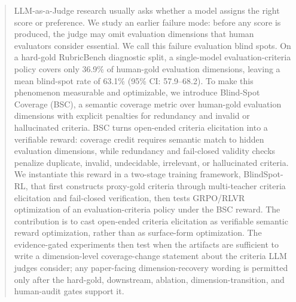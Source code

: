 \begin{abstract}
LLM-as-a-Judge research usually asks whether a model assigns the right score or
preference. We study an earlier failure mode: before any score is produced, the
judge may omit evaluation dimensions that human evaluators consider essential.
We call this failure evaluation blind spots. On a hard-gold RubricBench
diagnostic split, a single-model evaluation-criteria policy covers only 36.9\% of
human-gold evaluation dimensions, leaving a mean blind-spot rate of 63.1\%
(95\% CI: 57.9--68.2). To make this phenomenon measurable and optimizable, we
introduce Blind-Spot Coverage (BSC), a semantic coverage metric over
human-gold evaluation dimensions with explicit penalties for redundancy and
invalid or hallucinated criteria. BSC turns open-ended criteria elicitation into a
verifiable reward: coverage credit requires semantic match to hidden evaluation
dimensions, while redundancy and fail-closed validity checks penalize duplicate,
invalid, undecidable, irrelevant, or hallucinated criteria. We
instantiate this reward in a two-stage training framework, BlindSpot-RL, that
first constructs proxy-gold criteria through multi-teacher criteria elicitation
and fail-closed verification, then tests GRPO/RLVR optimization of an
evaluation-criteria policy under the BSC reward. The contribution is to cast
open-ended criteria elicitation as verifiable semantic reward
optimization, rather than as surface-form optimization.
The evidence-gated experiments then test when the artifacts are sufficient to
write a dimension-level coverage-change statement about the criteria LLM judges
consider; any paper-facing dimension-recovery wording is permitted only after
the hard-gold, downstream, ablation, dimension-transition, and human-audit gates
support it.
\end{abstract}
